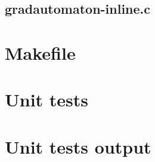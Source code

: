 \subsection{gradautomaton-inline.c}

\begin{scriptsize}
\begin{ttfamily}

\end{ttfamily}
\end{scriptsize}

\section{Makefile}

\begin{scriptsize}
\begin{ttfamily}

\end{ttfamily}
\end{scriptsize}

\section{Unit tests}

\begin{scriptsize}
\begin{ttfamily}

\end{ttfamily}
\end{scriptsize}

\section{Unit tests output}

\begin{scriptsize}
\begin{ttfamily}

\end{ttfamily}
\end{scriptsize}



